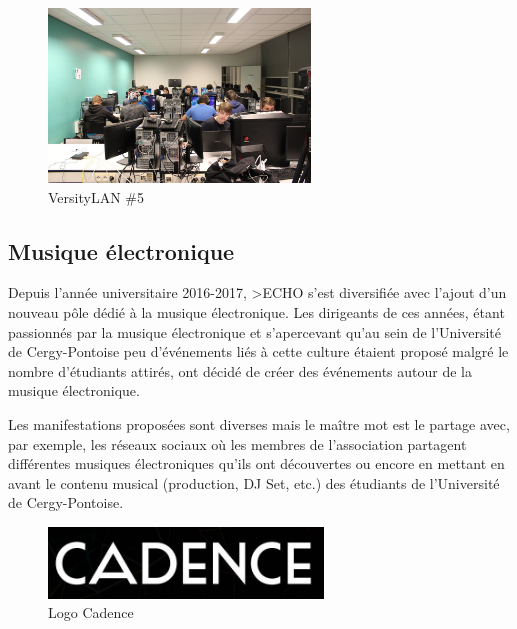            \begin{figure}[ht]
                \centering
                \includegraphics[width=0.62\textwidth]{images/versity5.jpg}
                \caption{VersityLAN \#5}
            \end{figure}
            
            
        
        
    
    \subsection{Musique électronique}
    
        Depuis l'année universitaire 2016-2017, >ECHO s'est diversifiée avec l'ajout d'un nouveau pôle dédié à la musique électronique. Les dirigeants de ces années, étant passionnés par la musique électronique et s'apercevant qu'au sein de l'Université de Cergy-Pontoise peu d'événements liés à cette culture étaient proposé malgré le nombre d'étudiants attirés, ont décidé de créer des événements autour de la musique électronique.
        
        Les manifestations proposées sont diverses mais le maître mot est le partage avec, par exemple, les réseaux sociaux où les membres de l'association partagent différentes musiques électroniques qu'ils ont découvertes ou encore en mettant en avant le contenu musical (production, DJ Set, etc.) des étudiants de l'Université de Cergy-Pontoise.
        
        \begin{figure}[ht]
            \centering
            \includegraphics[width=0.65\textwidth]{images/logo_cadence.jpg}
            \caption{Logo Cadence}
        \end{figure}
            
